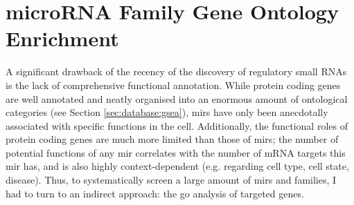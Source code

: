 \section{microRNA Family Gene Ontology Enrichment}
A significant drawback of the recency of the discovery of regulatory small RNAs is the lack of comprehensive functional annotation. While protein coding genes are well annotated and neatly organised into an enormous amount of ontological categories (see Section \ref{sec:database:gsea}), \acp{mir} have only been anecdotally associated with specific functions in the cell. Additionally, the functional roles of protein coding genes are much more limited than those of \acp{mir}; the number of potential functions of any \ac{mir} correlates with the number of mRNA targets this \ac{mir} has, and is also highly context-dependent (e.g. regarding cell type, cell state, disease). Thus, to systematically screen a large amount of \acp{mir} and families, I had to turn to an indirect approach: the \ac{go} analysis of targeted genes.

